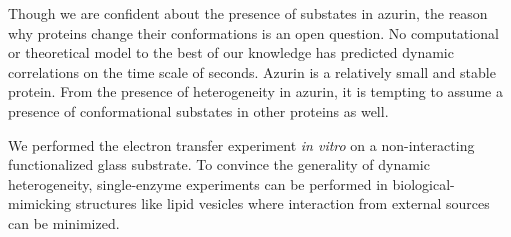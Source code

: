 Though we are confident about the presence of substates in azurin, the reason why proteins change their conformations is an open question.
No computational or theoretical model to the best of our knowledge has predicted dynamic correlations on the time scale of seconds.
Azurin is a relatively small and stable protein.
From the presence of heterogeneity in azurin, it is tempting to assume a presence of conformational substates in other proteins as well.


We performed the electron transfer experiment \textit{in vitro} on a non-interacting functionalized glass substrate.
To convince the generality of dynamic heterogeneity, single-enzyme experiments can be performed in biological-mimicking structures like lipid vesicles where interaction from external sources can be minimized.